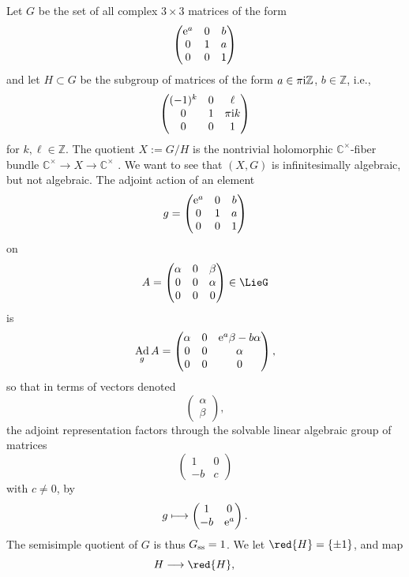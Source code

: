 \documentclass[10pt,a4paper]{amsart}
\providecommand{\C}{}
\numberwithin{equation}{section}
\renewcommand{\C}{\mathbb{C}}
\newcommand{\Z}{\mathbb{Z}}
\DeclareMathOperator{\Ad}{Ad}
\begin{document}
\begin{Example}
Let $G$ be the set of all complex $3 \times 3$ matrices of the form
\[
\begin{pmatrix}
{\rm e}^a & 0 & b \\
0 & 1 & a \\
0 & 0 & 1
\end{pmatrix}
\]
and let $H \subset G$ be the subgroup of matrices of the form $a \in \pi {\rm i} \Z$, $b \in \Z$, i.e.,
\[
\begin{pmatrix}
(-1)^k & 0 & \ell \\
0 & 1 & \pi {\rm i} k \\
0 & 0 & 1
\end{pmatrix}
\]
for $k,\ell \in \Z$.
The quotient $X := G/H$ is the nontrivial holomorphic $\C^{\times}$-fiber bundle $\C^{\times} \to X
 \to \C^{\times}$ \cite[Section~11]{McKay:2015}.
We want to see that $(X, G)$ is infinitesimally algebraic, but not algebraic.
The adjoint action of an element
\[
g =
\begin{pmatrix}
{\rm e}^a & 0 & b \\
0 & 1 & a \\
0 & 0 & 1
\end{pmatrix}
\]
on
\[
A=
\begin{pmatrix}
\alpha & 0 & \beta \\
0 & 0 & \alpha \\
0 & 0 & 0
\end{pmatrix}
\in \LieG
\]
is
\[
\Ad_g A =
\begin{pmatrix}
\alpha & 0 & {\rm e}^a\beta-b\alpha \\
0 & 0 & \alpha \\
0 & 0 & 0
\end{pmatrix},
\]
so that in terms of vectors denoted
\[
\begin{pmatrix}
\alpha \\
\beta
\end{pmatrix},
\]
the adjoint representation factors through the solvable linear algebraic group of matrices
\[
\begin{pmatrix}
1 & 0 \\
-b & c
\end{pmatrix}
\]
with $c\ne 0$, by
\[
g \longmapsto
\begin{pmatrix}
1 & 0 \\
-b & {\rm e}^a
\end{pmatrix}.
\]
The semisimple quotient of $G$ is thus $G_{\rm ss} = 1$.
We let $\red{H} = \{\pm 1\}$, and map
\[
H \longrightarrow \red{H}, \qquad
\]
\end{Example}
\end{document}
